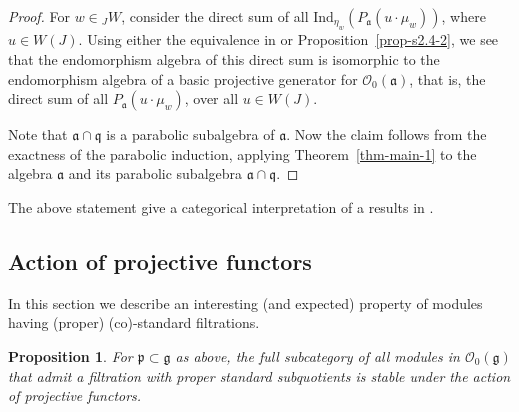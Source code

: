 \documentclass[a4paper]{amsart}
\newtheorem{proposition}[theorem]{Proposition}
\begin{document}
\begin{proof}
For $w\in {}_JW$, consider { the direct sum of 
all $\mathrm{Ind}_{\eta_w}(P_\mathfrak{a}(u\cdot \mu_w))$, where
$u\in W(J)$. Using either the equivalence in \cite[Theorem~32]{CMZ}
or Proposition~\ref{prop-s2.4-2}, we see that
the endomorphism algebra of this direct sum is isomorphic to the
endomorphism algebra of a basic projective generator for
$\mathcal{O}_0(\mathfrak{a})$, that is, the direct sum of all
$P_\mathfrak{a}(u\cdot \mu_w)$, over all $u\in W(J)$.}

Note that 
$\mathfrak{a}\cap\mathfrak{q}$ is a parabolic subalgebra
of $\mathfrak{a}$. Now the claim follows from the 
exactness of the parabolic induction, applying 
Theorem~\ref{thm-main-1} to the algebra $\mathfrak{a}$
and its parabolic subalgebra $\mathfrak{a}\cap\mathfrak{q}$.
\end{proof}

The above statement give a categorical interpretation of 
a results in \cite{BMS}.


\subsection{Action of projective functors}\label{s3.4}

In this section we describe an interesting (and expected) property
of modules having (proper) (co)-standard filtrations.

\begin{proposition}\label{prop-s3.4-1}
For $\mathfrak{p}\subset \mathfrak{g}$ as above, the full 
subcategory of all modules in $\mathcal{O}_0(\mathfrak{g})$
that admit a filtration with proper standard subquotients is
stable under the action of projective functors.
\end{proposition}
\end{document}

